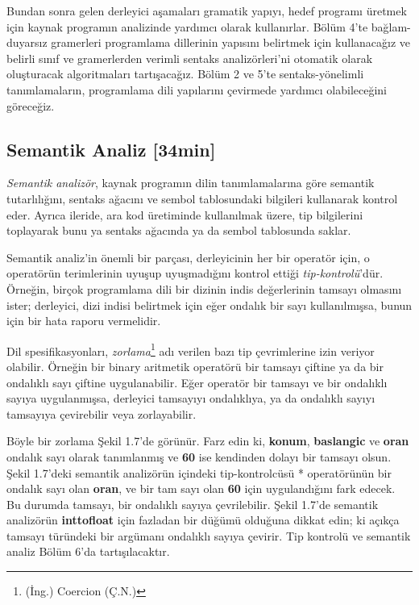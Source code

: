 \documentclass{book}
\begin{document}
Bundan sonra gelen derleyici aşamaları gramatik yapıyı, hedef programı üretmek için kaynak programın analizinde yardımcı olarak kullanırlar. Bölüm 4'te bağlam-duyarsız gramerleri programlama dillerinin yapısını belirtmek için kullanacağız ve belirli sınıf ve gramerlerden verimli sentaks analizörleri'ni otomatik olarak oluşturacak algoritmaları tartışacağız. Bölüm 2 ve 5'te sentaks-yönelimli tanımlamaların, programlama dili yapılarını çevirmede yardımcı olabileceğini göreceğiz.

\subsection{Semantik Analiz [34min]}
\textit{Semantik analizör}, kaynak programın dilin tanımlamalarına göre semantik tutarlılığını, sentaks ağacını ve sembol tablosundaki bilgileri kullanarak kontrol eder. Ayrıca ileride, ara kod üretiminde kullanılmak üzere, tip bilgilerini toplayarak bunu ya sentaks ağacında ya da sembol tablosunda saklar.

Semantik analiz'in önemli bir parçası, derleyicinin her bir operatör için, o operatörün terimlerinin uyuşup uyuşmadığını kontrol ettiği \textit{tip-kontrolü}'dür. Örneğin, birçok programlama dili bir dizinin indis değerlerinin tamsayı olmasını ister; derleyici, dizi indisi belirtmek için eğer ondalık bir sayı kullanılmışsa, bunun için bir hata raporu vermelidir.

Dil spesifikasyonları, \textit{zorlama}\footnote{(İng.) Coercion (Ç.N.)} adı verilen bazı tip çevrimlerine izin veriyor olabilir. Örneğin bir binary aritmetik operatörü bir tamsayı çiftine ya da bir ondalıklı sayı çiftine uygulanabilir. Eğer operatör bir tamsayı ve bir ondalıklı sayıya uygulanmışsa, derleyici tamsayıyı ondalıklıya, ya da ondalıklı sayıyı tamsayıya çevirebilir veya zorlayabilir.

Böyle bir zorlama Şekil 1.7'de görünür. Farz edin ki, \textbf{konum}, \textbf{baslangic} ve \textbf{oran} ondalık sayı olarak tanımlanmış ve \textbf{60} ise kendinden dolayı bir tamsayı olsun. Şekil 1.7'deki semantik analizörün içindeki tip-kontrolcüsü * operatörünün bir ondalık sayı olan \textbf{oran}, ve bir tam sayı olan \textbf{60} için uygulandığını fark edecek. Bu durumda tamsayı, bir ondalıklı sayıya çevrilebilir. Şekil 1.7'de semantik analizörün \textbf{inttofloat} için fazladan bir düğümü olduğuna dikkat edin; ki açıkça tamsayı türündeki bir argümanı ondalıklı sayıya çevirir. Tip kontrolü ve semantik analiz Bölüm 6'da tartışılacaktır.
\end{document}
